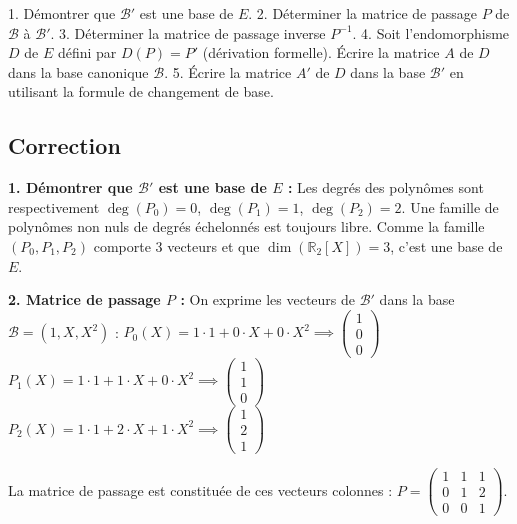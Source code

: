 \documentclass{report}
\begin{document}
1. Démontrer que $\mathcal{B}'$ est une base de $E$.
2. Déterminer la matrice de passage $P$ de $\mathcal{B}$ à $\mathcal{B}'$.
3. Déterminer la matrice de passage inverse $P^{-1}$.
4. Soit l'endomorphisme $D$ de $E$ défini par $D(P) = P'$ (dérivation formelle).
   Écrire la matrice $A$ de $D$ dans la base canonique $\mathcal{B}$.
5. Écrire la matrice $A'$ de $D$ dans la base $\mathcal{B}'$ en utilisant la formule de changement de base.

\subsection*{Correction}
\textbf{1. Démontrer que $\mathcal{B}'$ est une base de $E$ :}
Les degrés des polynômes sont respectivement $\deg(P_0)=0$, $\deg(P_1)=1$, $\deg(P_2)=2$.
Une famille de polynômes non nuls de degrés échelonnés est toujours libre.
Comme la famille $(P_0, P_1, P_2)$ comporte 3 vecteurs et que $\dim(\mathbb{R}_2[X]) = 3$, c'est une base de $E$.

\textbf{2. Matrice de passage $P$ :}
On exprime les vecteurs de $\mathcal{B}'$ dans la base $\mathcal{B} = (1, X, X^2)$ :
$P_0(X) = 1 \cdot 1 + 0 \cdot X + 0 \cdot X^2 \implies \begin{pmatrix} 1 \\ 0 \\ 0 \end{pmatrix}$
$P_1(X) = 1 \cdot 1 + 1 \cdot X + 0 \cdot X^2 \implies \begin{pmatrix} 1 \\ 1 \\ 0 \end{pmatrix}$
$P_2(X) = 1 \cdot 1 + 2 \cdot X + 1 \cdot X^2 \implies \begin{pmatrix} 1 \\ 2 \\ 1 \end{pmatrix}$

La matrice de passage est constituée de ces vecteurs colonnes :
$P = \begin{pmatrix} 1 & 1 & 1 \\ 0 & 1 & 2 \\ 0 & 0 & 1 \end{pmatrix}$.
\end{document}
